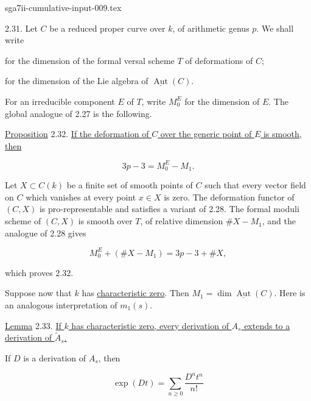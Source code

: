 \begin{filecontents*}{sga7ii-cumulative-input-009.tex}

2.31. Let $C$ be a reduced proper curve over $k$, of arithmetic genus $p$.
We shall write

\begin{description}[leftmargin=2.7cm,style=nextline]
\item[$M_0$] for the dimension of the formal versal scheme $T$ of deformations
of $C$;
\item[$M_1$] for the dimension of the Lie algebra of
$\underline{\operatorname{Aut}}(C)$.
\end{description}

For an irreducible component $E$ of $T$, write $M_0^E$ for the dimension of
$E$.  The global analogue of 2.27 is the following.

\underline{Proposition} 2.32. \underline{If the deformation of $C$ over the
generic point of $E$ is smooth, then}

\begin{equation*}
3p-3=M_0^E-M_1.
\end{equation*}

Let $X\subset C(k)$ be a finite set of smooth points of $C$ such that every
vector field on $C$ which vanishes at every point $x\in X$ is zero.  The
deformation functor of $(C,X)$ is pro-representable and satisfies a variant of
2.28.  The formal moduli scheme of $(C,X)$ is smooth over $T$, of relative
dimension $\#X-M_1$, and the analogue of 2.28 gives

\begin{equation*}
M_0^E+(\#X-M_1)=3p-3+\#X,
\end{equation*}

which proves 2.32.

Suppose now that $k$ has \underline{characteristic zero}.  Then
$M_1=\dim\underline{\operatorname{Aut}}(C)$.  Here is an analogous
interpretation of $m_1(s)$.


\underline{Lemma} 2.33. \underline{If $k$ has characteristic zero, every
derivation of $A_s$ extends to a derivation of $\widetilde A_s$.}

If $D$ is a derivation of $A_s$, then

\begin{equation*}
\exp(Dt)=\sum_{n\geq0}\frac{D^nt^n}{n!}
\end{equation*}


\end{filecontents*}
